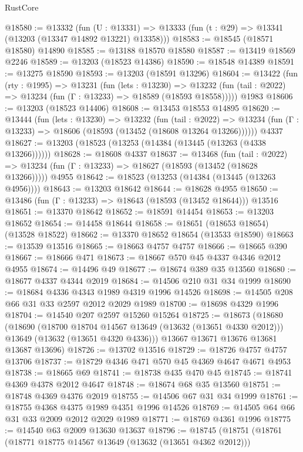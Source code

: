 \begin{lexlean}{RustCore}
\begin{coremodule}
@18580 := @13332
    (fun (U : @13331) => @13333 (fun (t : @29) => @13341 (@13203 (@13347 @14892 @13221) @13358)))
@18583 := @18545 (@18571 @18580) @14890
@18585 := @13188 @18570 @18580
@18587 := @13419 @18569 @2246
@18589 := @13203 (@18523 @14386)
@18590 := @18548 @14389
@18591 := @13275 @18590
@18593 := @13203 (@18591 @13296)
@18604 := @13422
    (fun (rty : @1995) =>
    @13231
      (fun (lets : @13230) =>
      @13232 (fun (tail : @2022) => @13234 (fun (Γ : @13233) => @18589 (@18593 @18558)))))
    @1983
@18606 := @13203 (@18523 @14406)
@18608 := @13453 @18553 @14895
@18620 := @13444
    (fun (lets : @13230) =>
    @13232
      (fun (tail : @2022) =>
      @13234 (fun (Γ : @13233) => @18606 (@18593 (@13452 (@18608 @13264 @13266))))))
    @4337
@18627 := @13203 (@18523 (@13253 (@14384 (@13445 (@13263 (@4338 @13266))))))
@18628 := @18608 @4337
@18637 := @13468
    (fun (tail : @2022) => @13234 (fun (Γ : @13233) => @18627 (@18593 (@13452 (@18628 @13266)))))
    @4955
@18642 := @18523 (@13253 (@14384 (@13445 (@13263 @4956))))
@18643 := @13203 @18642
@18644 := @18628 @4955
@18650 := @13486 (fun (Γ : @13233) => @18643 (@18593 (@13452 @18644))) @13516
@18651 := @13370 @18642
@18652 := @18591 @14454
@18653 := @13203 @18652
@18654 := @14458 @18644
@18658 := @18651 (@18653 @18654) (@13528 @18522)
@18662 := @13370 @18652 @18654 (@13533 @18590)
@18663 := @13539 @13516
@18665 := @18663 @4757 @4757
@18666 := @18665 @390
@18667 := @18666 @471
@18673 := @18667 @570 @45 @4337 @4346 @2012 @4955
@18674 := @14496 @49
@18677 := @18674 @389 @35 @13560
@18680 := @18677 @4337 @4344 @2019
@18684 := @14506 @210 @31 @34 @1999
@18690 := @18684 @4336 @4343 @1989 @4319 @1996 @14526
@18698 := @14505 @208 @66 @31 @33 @2597 @2012 @2029 @1989
@18700 := @18698 @4329 @1996
@18704 := @14540 @207 @2597 @15260 @15264
@18725 := @18673
    (@18680
      (@18690
        (@18700 @18704 @14567 @13649 (@13632 (@13651 @4330 @2012)))
        @13649
        (@13632 (@13651 @4320 @4336)))
      @13667
      @13671
      @13676
      @13681
      @13687
      @13696)
@18726 := @13702 @13516
@18729 := @18726 @4757 @4757 @13706
@18737 := @18729 @4346 @471 @570 @45 @4369 @4647 @4671 @4953
@18738 := @18665 @69
@18741 := @18738 @435 @470 @45
@18745 := @18741 @4369 @4378 @2012 @4647
@18748 := @18674 @68 @35 @13560
@18751 := @18748 @4369 @4376 @2019
@18755 := @14506 @67 @31 @34 @1999
@18761 := @18755 @4368 @4375 @1989 @4351 @1996 @14526
@18769 := @14505 @64 @66 @31 @33 @2009 @2012 @2029 @1989
@18771 := @18769 @4361 @1996
@18775 := @14540 @63 @2009 @13630 @13637
@18796 := @18745
    (@18751
      (@18761
        (@18771 @18775 @14567 @13649 (@13632 (@13651 @4362 @2012)))

\end{coremodule}
\end{lexlean}
